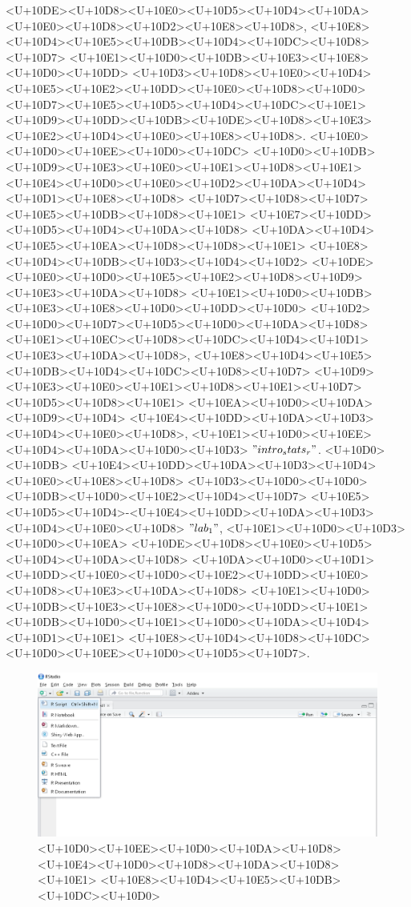 \documentclass{article}
\begin{document}
<U+10DE><U+10D8><U+10E0><U+10D5><U+10D4><U+10DA> <U+10E0><U+10D8><U+10D2><U+10E8><U+10D8>, <U+10E8><U+10D4><U+10E5><U+10DB><U+10D4><U+10DC><U+10D8><U+10D7> <U+10E1><U+10D0><U+10DB><U+10E3><U+10E8><U+10D0><U+10DD> <U+10D3><U+10D8><U+10E0><U+10D4><U+10E5><U+10E2><U+10DD><U+10E0><U+10D8><U+10D0> <U+10D7><U+10E5><U+10D5><U+10D4><U+10DC><U+10E1> <U+10D9><U+10DD><U+10DB><U+10DE><U+10D8><U+10E3><U+10E2><U+10D4><U+10E0><U+10E8><U+10D8>. <U+10E0><U+10D0><U+10EE><U+10D0><U+10DC> <U+10D0><U+10DB> <U+10D9><U+10E3><U+10E0><U+10E1><U+10D8><U+10E1> <U+10E4><U+10D0><U+10E0><U+10D2><U+10DA><U+10D4><U+10D1><U+10E8><U+10D8> <U+10D7><U+10D8><U+10D7><U+10E5><U+10DB><U+10D8><U+10E1> <U+10E7><U+10DD><U+10D5><U+10D4><U+10DA><U+10D8> <U+10DA><U+10D4><U+10E5><U+10EA><U+10D8><U+10D8><U+10E1> <U+10E8><U+10D4><U+10DB><U+10D3><U+10D4><U+10D2> <U+10DE><U+10E0><U+10D0><U+10E5><U+10E2><U+10D8><U+10D9><U+10E3><U+10DA><U+10D8> <U+10E1><U+10D0><U+10DB><U+10E3><U+10E8><U+10D0><U+10DD><U+10D0> <U+10D2><U+10D0><U+10D7><U+10D5><U+10D0><U+10DA><U+10D8><U+10E1><U+10EC><U+10D8><U+10DC><U+10D4><U+10D1><U+10E3><U+10DA><U+10D8>, <U+10E8><U+10D4><U+10E5><U+10DB><U+10D4><U+10DC><U+10D8><U+10D7> <U+10D9><U+10E3><U+10E0><U+10E1><U+10D8><U+10E1><U+10D7><U+10D5><U+10D8><U+10E1> <U+10EA><U+10D0><U+10DA><U+10D9><U+10D4> <U+10E4><U+10DD><U+10DA><U+10D3><U+10D4><U+10E0><U+10D8>, <U+10E1><U+10D0><U+10EE><U+10D4><U+10DA><U+10D0><U+10D3> $"intro_stats_r"$. <U+10D0><U+10DB> <U+10E4><U+10DD><U+10DA><U+10D3><U+10D4><U+10E0><U+10E8><U+10D8> <U+10D3><U+10D0><U+10D0><U+10DB><U+10D0><U+10E2><U+10D4><U+10D7> <U+10E5><U+10D5><U+10D4>-<U+10E4><U+10DD><U+10DA><U+10D3><U+10D4><U+10E0><U+10D8> $"lab_1"$, <U+10E1><U+10D0><U+10D3><U+10D0><U+10EA> <U+10DE><U+10D8><U+10E0><U+10D5><U+10D4><U+10DA><U+10D8> <U+10DA><U+10D0><U+10D1><U+10DD><U+10E0><U+10D0><U+10E2><U+10DD><U+10E0><U+10D8><U+10E3><U+10DA><U+10D8> <U+10E1><U+10D0><U+10DB><U+10E3><U+10E8><U+10D0><U+10DD><U+10E1> <U+10DB><U+10D0><U+10E1><U+10D0><U+10DA><U+10D4><U+10D1><U+10E1> <U+10E8><U+10D4><U+10D8><U+10DC><U+10D0><U+10EE><U+10D0><U+10D5><U+10D7>.

\begin{figure}[h]
\centering
\includegraphics[width=\textwidth]{img/new_menu.PNG}
\caption{<U+10D0><U+10EE><U+10D0><U+10DA><U+10D8> <U+10E4><U+10D0><U+10D8><U+10DA><U+10D8><U+10E1> <U+10E8><U+10D4><U+10E5><U+10DB><U+10DC><U+10D0>}
    \label{create:file}
\end{figure}
\end{document}
